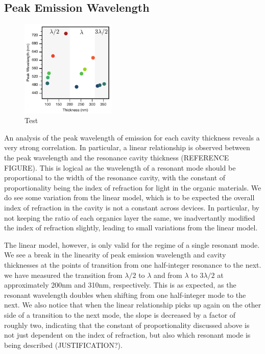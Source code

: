 \documentclass{report}
\begin{document}
    
        \subsection{Peak Emission Wavelength}
            \begin{figure}
                \centering
                \includegraphics[width=0.4\textwidth]{images/n1_peak_emission.png}
                \caption{Test}
            \end{figure}

            An analysis of the peak wavelength of emission for each cavity thickness reveals a very strong correlation. In particular, a linear relationship is observed between the peak wavelength and the resonance cavity thickness (REFERENCE FIGURE). This is logical as the wavelength of a resonant mode should be proportional to the width of the resonance cavity, with the constant of proportionality being the index of refraction for light in the organic materials. We do see some variation from the linear model, which is to be expected the overall index of refraction in the cavity is not a constant across devices. In particular, by not keeping the ratio of each organics layer the same, we inadvertantly modified the index of refraction slightly, leading to small variations from the linear model.
            
            The linear model, however, is only valid for the regime of a single resonant mode. We see a break in the linearity of peak emission wavelength and cavity thicknesses at the points of transition from one half-integer resonance to the next. we have measured the transition from $\lambda/2$ to $\lambda$ and from $\lambda$ to $3\lambda/2$ at approximately 200nm and 310nm, respectively. This is as expected, as the resonant wavelength doubles when shifting from one half-integer mode to the next. We also notice that when the linear relationship picks up again on the other side of a transition to the next mode, the slope is decreased by a factor of roughly two, indicating that the constant of proportionality discussed above is not just dependent on the index of refraction, but also which resonant mode is being described (JUSTIFICATION?).
        
\end{document}
